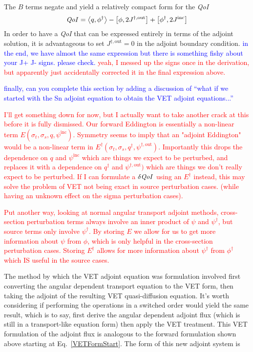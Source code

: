 \documentclass{article}
\newcommand{\bra}{\left\langle}
\newcommand{\ket}{\right\rangle}
\newcommand{\sbra}{\left[}
\newcommand{\sket}{\right]}
\newcommand{\sigt}{\sigma_t}
\newcommand{\sigs}{\sigma_s}
\newcommand{\scalSource}{q}
\newcommand{\qoi}{{\it QoI}\xspace}
\newcommand{\comment}[2]{\marginpar{\textcolor{#2}{$\star$}}\textcolor{#2}{#1}\newline}
\newcommand{\iwh}[1]{\comment{#1}{red}}
\newcommand{\jcr}[1]{\comment{#1}{blue}}
\newcommand{\iwh}[1]{\phantom{a}}
\newcommand{\jcr}[1]{\phantom{a}}
\begin{document}
The $B$ terms negate and yield a relatively compact form for the \qoi
\begin{equation}
\label{VETQoIAdj}
\qoi=\bra \scalSource , \phi^\dag \ket 
- \sbra \phi, 2J^{\dag,\text{out}} \sket  + \sbra \phi^\dag, 2J^{\text{inc}} \sket
\end{equation}
In order to have a \qoi that can be expressed entirely in terms of the adjoint solution, it is advantageous to 
set $J^{\dag,\text{out}}=0$ in the adjoint boundary condition.
\jcr{in the end, we have almost the same expression but there is something fishy about your J+ J- signs. please check.}
\iwh{yeah, I messed up the signs once in the derivation, but apparently just accidentally corrected it in the final expression above.}

\jcr{finally, can you complete this section by adding a discussion of "`what if we started with the Sn adjoint equation to obtain the VET adjoint equations..."'}


\iwh{I'll get something down for now, but I actually want to take another crack at this before it is fully dismissed. Our forward Eddington is essentially a non-linear term $E(\sigt,\sigs,q,\psi^{\text{inc}})$. Symmetry seems to imply that an "adjoint Eddington" would be a non-linear term in $E^\dag(\sigt,\sigs,q^\dag,\psi^{\dag,\text{out}})$. Importantly this drops the dependence on $q$ and $\psi^{\text{inc}}$ which are things we expect to be perturbed, and replaces it with a dependence on $q^\dag$ and $\psi^{\dag,\text{out}})$ which are things we don't really expect to be perturbed. If I can formulate a $\delta \qoi$ using an $E^\dag$ instead, this may solve the problem of VET not being exact in source perturbation cases. (while having an unknown effect on the sigma perturbation cases).}


\iwh{Put another way, looking at normal angular transport adjoint methods, cross-section perturbation terms always involve an inner product of $\psi$ and $\psi^\dag$, but source terms only involve $\psi^\dag$. By storing $E$ we allow for us to get more information about $\psi$ from $\phi$, which is only helpful in the cross-section perturbation cases. Storing $E^\dag$ allows for more information about $\psi^\dag$ from $\phi^\dag$ which IS useful in the source cases.}


The method by which the VET adjoint equation was formulation involved first converting the angular dependent transport equation to the VET form, then taking the adjoint of the resulting VET quasi-diffusion equation. It's worth considering if performing the operations in a switched order would yield the same result, which is to say, first derive the angular dependent adjoint flux (which is still in a transport-like equation form) then apply the VET treatment. This VET formulation of the adjoint flux is analogous to the forward formulation shown above starting at   Eq.~\eqref{VETFormStart}. The form of this new adjoint system is
\end{document}
